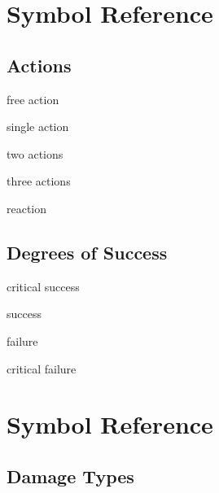 \documentclass[paper=63mm:88mm, DIV=21, fontsize=7.5pt]{scrartcl}
\begin{document}
\pagestyle{empty}



\setlength\parindent{0pt} %
\setlength\parskip{4pt} %


\renewcommand*{\sectionformat}{}
\renewcommand*{\subsectionformat}{}

\newcommand{\Card}[3]{\section{#3 \hfill \color{gray} #1 #2}}

\section{Symbol Reference}

\subsection{Actions\hfill{}}

 free action

 single action

 two actions

 three actions

 reaction

\subsection{Degrees of Success\hfill{}}
\begin{multicols}{2}
\footnotesize
{} critical success

 success

 failure

 critical failure
\end{multicols}

\section{Symbol Reference}
\subsection{Damage Types\hfill{}}
\end{document}
